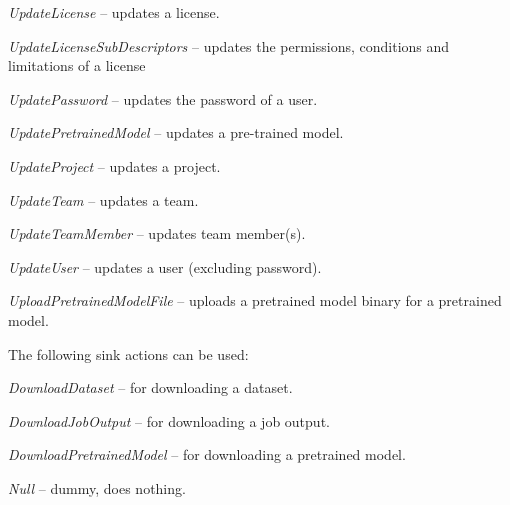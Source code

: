 \documentclass[a4paper]{book}
\begin{document}
\begin{tight_itemize}
  \item \textit{UpdateLicense} -- updates a license.
  \item \textit{UpdateLicenseSubDescriptors} -- updates the permissions, conditions and limitations of a license
  \item \textit{UpdatePassword} -- updates the password of a user.
  \item \textit{UpdatePretrainedModel} -- updates a pre-trained model.
  \item \textit{UpdateProject} -- updates a project.
  \item \textit{UpdateTeam} -- updates a team.
  \item \textit{UpdateTeamMember} -- updates team member(s).
  \item \textit{UpdateUser} -- updates a user (excluding password).
  \item \textit{UploadPretrainedModelFile} -- uploads a pretrained model binary for a pretrained model.
\end{tight_itemize}
The following sink actions can be used:
\begin{tight_itemize}
  \item \textit{DownloadDataset} -- for downloading a dataset.
  \item \textit{DownloadJobOutput} -- for downloading a job output.
  \item \textit{DownloadPretrainedModel} -- for downloading a pretrained model.
  \item \textit{Null} -- dummy, does nothing.
\end{tight_itemize}
\end{document}
